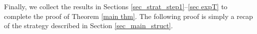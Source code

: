 \documentclass{article}
\makeatletter
\newcommand{\1}{\mathds{1}}
\numberwithin{equation}{section}
\newcommand{\al}{\alpha}
\theoremstyle{plain} %
\theoremstyle{remark}
\newtheorem{remark}[theorem]{Remark}
\newcommand{\Sele}{{\mathcal E}}
\newcommand{\ATn}{\mathcal A_T^{(>n)}}
\renewcommand{\subsection}{\@startsection
{subsection}%
{2}%
{0mm}%
{-\baselineskip}%
{0.5\baselineskip}%
{\normalfont\bf\itshape}} %
\makeatother
\begin{document}


Finally, we collect the results in Sections \ref{sec_strat_step1}--\ref{sec expT}  to complete the proof of Theorem \ref{main thm}. The following proof is simply a recap of the strategy described in Section \ref{sec_main_struct}.
\end{document}
